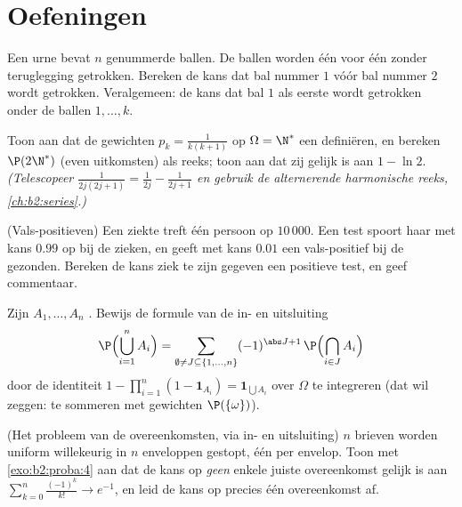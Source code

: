 \section{Oefeningen}

\begin{exercise}[$\star$]\label{exo:b2:proba:1}
Een urne bevat $n$ genummerde ballen. De ballen worden één voor één
zonder teruglegging getrokken. Bereken de kans dat bal nummer $1$
vóór bal nummer $2$ wordt getrokken. Veralgemeen: de kans dat bal
$1$ als eerste wordt getrokken onder de ballen $1, \dots, k$.
\end{exercise}

\begin{exercise}[$\star$]\label{exo:b2:proba:2}
Toon aan dat de gewichten $p_k = \frac{1}{k(k+1)}$ op $\Omega =
\N^*$ een  definiëren, en bereken $\P(2\N^*)$ (even
uitkomsten) als reeks; toon aan dat zij gelijk is aan $1 - \ln 2$.
\emph{(Telescopeer $\frac{1}{2j(2j+1)} = \frac{1}{2j} -
\frac{1}{2j+1}$ en gebruik de alternerende harmonische reeks,
\cref{ch:b2:series}.)}
\end{exercise}

\begin{exercise}[$\star$]\label{exo:b2:proba:3}
(Vals-positieven) Een ziekte treft één persoon op $10\,000$. Een
test spoort haar met kans $0.99$ op bij de zieken, en geeft met
kans $0.01$ een vals-positief bij de gezonden. Bereken de kans ziek
te zijn gegeven een positieve test, en geef commentaar.
\end{exercise}

\begin{exercise}[$\star\star$]\label{exo:b2:proba:4}
Zijn $A_1, \dots, A_n$ . Bewijs de formule van de in-
en uitsluiting
\[
\P\Bigl(\bigcup_{i=1}^n A_i\Bigr)
= \sum_{\emptyset \neq J \subseteq \{1,\dots,n\}}
(-1)^{\abs J + 1}\,\P\Bigl(\bigcap_{i \in J}A_i\Bigr)
\]
door de identiteit $1 - \prod_{i=1}^n(1 - \mathbf{1}_{A_i}) =
\mathbf{1}_{\bigcup A_i}$ over $\Omega$ te integreren (dat wil
zeggen: te sommeren met gewichten $\P(\{\omega\})$).
\end{exercise}

\begin{exercise}[$\star\star$]\label{exo:b2:proba:5}
(Het probleem van de overeenkomsten, via in- en uitsluiting) $n$
brieven worden uniform willekeurig in $n$ enveloppen gestopt, één
per envelop. Toon met \cref{exo:b2:proba:4} aan dat de kans op
\emph{geen} enkele juiste overeenkomst gelijk is aan $\sum_{k=0}^n
\frac{(-1)^k}{k!} \to e^{-1}$, en leid de kans op precies één
overeenkomst af.
\end{exercise}

